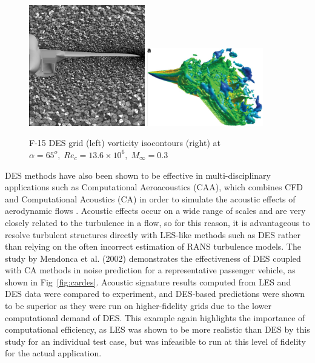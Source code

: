 \documentclass[journal]{new-aiaa}
\begin{document}
\begin{figure}[H]
\begin{center}
\includegraphics[width=0.45\textwidth]{Images/logan/forsythe2004detachededdy_f15grid.pdf}
\includegraphics[width=0.45\textwidth]{Images/logan/spalart2009detachededdy_f15des.pdf}
\caption{ F-15 DES grid (left) \cite{forsythe2004detachededdy} vorticity isocontours (right) at $\alpha=65^o, \; Re_c=13.6\times10^6, \; M_{\infty}=0.3$ \cite{spalart2009detachededdy} }
\label{fig:f15des}
\end{center}
\end{figure}





DES methods have also been shown to be effective in multi-disciplinary applications such as Computational Aeroacoustics (CAA), which combines CFD and Computational Acoustics (CA) in order to simulate the acoustic effects of aerodynamic flows \cite{mendonca2002towards}. Acoustic effects occur on a wide range of scales and are very closely related to the turbulence in a flow, so for this reason, it is advantageous to resolve turbulent structures directly with LES-like methods such as DES rather than relying on the often incorrect estimation of RANS turbulence models. The study by Mendonca et al. (2002) demonstrates the effectiveness of DES coupled with CA methods in noise prediction for a representative passenger vehicle, as shown in Fig~\ref{fig:cardes}. Acoustic signature results computed from LES and DES data were compared to experiment, and DES-based predictions were shown to be superior as they were run on higher-fidelity grids due to the lower computational demand of DES. This example again highlights the importance of computational efficiency, as LES was shown to be more realistic than DES by this study for an individual test case, but was infeasible to run at this level of fidelity for the actual application.
\end{document}
